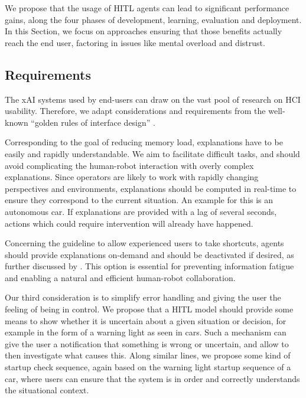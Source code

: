 \documentclass[twoside,11pt]{article}
\begin{document}
We propose that the usage of HITL agents can lead to significant performance gains, along the four phases of development, learning, evaluation and deployment. In this Section, we focus on approaches ensuring that those benefits actually reach the end user, factoring in issues like mental overload and distrust.

\subsection{Requirements}

The xAI systems used by end-users can draw on the vast pool of research on HCI usability. Therefore, we adapt considerations and requirements from the well-known ``golden rules of interface design'' \citep{ShneidermanEtAl:2016:GoldenRulesHCI}.

Corresponding to the goal of reducing memory load, explanations have to be easily and rapidly understandable. We aim to facilitate difficult tasks, and should avoid complicating the human-robot interaction with overly complex explanations. Since operators are likely to work with rapidly changing perspectives and environments, explanations should be computed in real-time to ensure they correspond to the current situation. An example for this is an autonomous car. If explanations are provided with a lag of several seconds, actions which could require intervention will already have happened.

Concerning the guideline to allow experienced users to take shortcuts, agents should provide explanations on-demand and should be deactivated if desired, as further discussed by \cite{AndersonBischof:2013:PerformanceGestureGuides}. This option is essential for preventing information fatigue and enabling a natural and efficient human-robot collaboration. 

Our third consideration is to simplify error handling and giving the user the feeling of being in control. We propose that a HITL model should provide some means to show whether it is uncertain about a given situation or decision, for example in the form of a warning light as seen in cars. Such a mechanism can give the user a notification that something is wrong or uncertain, and allow to then investigate what causes this.  Along similar lines, we propose some kind of startup check sequence, again based on the warning light startup sequence of a car, where users can ensure that the system is in order and correctly understands the situational context.
\end{document}
